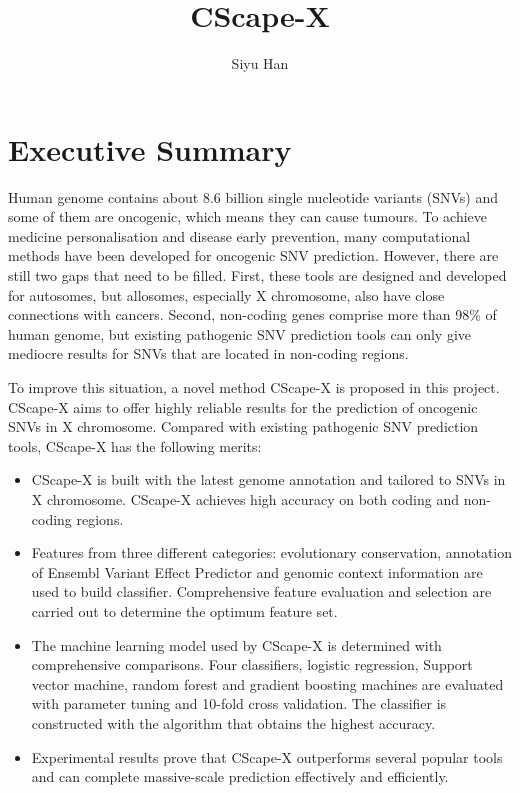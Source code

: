 \documentclass[a4paper,nohyper,nobib,openany,justified]{tufte-book}
\title{CScape-X}
\author[Siyu Han]{Siyu Han}
\begin{document}
\frontmatter
\chapter*{Executive Summary}
\begin{fullwidth}

Human genome contains about 8.6 billion single nucleotide variants (SNVs) and some of them are oncogenic, which means they can cause tumours. To achieve medicine personalisation and disease early prevention, many computational methods have been developed for oncogenic SNV prediction. However, there are still two gaps that need to be filled. First, these tools are designed and developed for autosomes, but allosomes, especially X chromosome, also have close connections with cancers. Second, non-coding genes comprise more than 98\% of human genome, but existing pathogenic SNV prediction tools can only give mediocre results for SNVs that are located in non-coding regions.

To improve this situation, a novel method CScape-X is proposed in this project. CScape-X aims to offer highly reliable results for the prediction of oncogenic SNVs in X chromosome. Compared with existing pathogenic SNV prediction tools, CScape-X has the following merits:

\begin{itemize}
  \item CScape-X is built with the latest genome annotation and tailored to SNVs in X chromosome. CScape-X achieves high accuracy on both coding and non-coding regions.
  \item Features from three different categories: evolutionary conservation, annotation of Ensembl Variant Effect Predictor and genomic context information are used to build classifier. Comprehensive feature evaluation and selection are carried out to determine the optimum feature set.
  \item The machine learning model used by CScape-X is determined with comprehensive comparisons. Four classifiers, logistic regression, Support vector machine, random forest and gradient boosting machines are evaluated with parameter tuning and 10-fold cross validation. The classifier is constructed with the algorithm that obtains the highest accuracy.
  \item Experimental results prove that CScape-X outperforms several popular tools and can complete massive-scale prediction effectively and efficiently.
\end{itemize}


\end{fullwidth}
\end{document}
